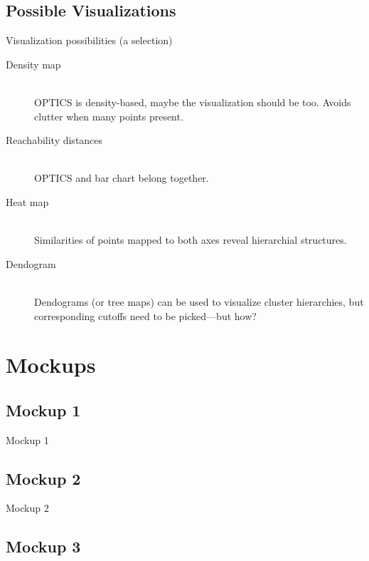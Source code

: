 \documentclass[naustrian]{beamer}
\begin{document}
\subsection{Possible Visualizations}

\begin{frame}{Visualization possibilities (a selection)}
    \begin{description}
        \item[Density map]\hfill\\
            OPTICS is density-based, maybe the visualization
            should be too. Avoids clutter when many points present.
        \item[Reachability distances]\hfill\\
            OPTICS and bar chart belong together.
        \item[Heat map \hfill]\hfill\\
            Similarities of points mapped to both axes reveal hierarchial
            structures.
        \item[Dendogram]\hfill\\
            Dendograms (or tree maps) can be used to visualize cluster
            hierarchies, but corresponding cutoffs need to be picked---but how?
    \end{description}
\end{frame}

\section{Mockups}

\subsection{Mockup 1}

\begin{frame}{Mockup 1}
\end{frame}

\subsection{Mockup 2}

\begin{frame}{Mockup 2}
\end{frame}

\subsection{Mockup 3}
\end{document}
